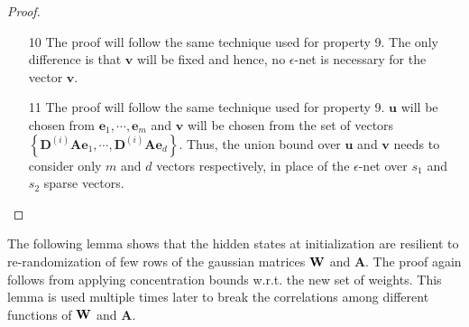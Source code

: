 \begin{proof}
\begin{enumerate}
		The proof follows from setting $t = \rho \sqrt{s_1}$ and taking an $\epsilon$-net bound over all $s_2$-sparse vectors $\mathbf{v}$ and $s_1$-sparse vectors $\mathbf{u}$, that amounts to an error probability at least $1-e^{\Omega(s_2 \log m)}e^{-\Omega(m/L^2)}- e^{\Omega(s_1 \log m)}e^{-\Omega(s_1 \rho^2)}$ , which simplifies to atleast $1-e^{-\Omega(\rho^2)}$, since $s_1, s_2 \le \frac{m}{\rho^3}$.
		\item[10] The proof will follow the same technique used for property 9. The only difference is that $\mathbf{v}$ will be fixed and hence, no $\epsilon$-net is necessary for the vector $\mathbf{v}$.
		\item[11] The proof will follow the same technique used for property 9. $\mathbf{u}$ will be chosen from $\mathbf{e}_1, \cdots, \mathbf{e}_m$ and $\mathbf{v}$ will be chosen from the set of vectors $\left\{ \mathbf{D}^{(i)} \mathbf{A}\mathbf{e}_1, \cdots, \mathbf{D}^{(i)} \mathbf{A}\mathbf{e}_d \right\}$. Thus, the union bound over $\mathbf{u}$ and $\mathbf{v}$ needs to consider only $m$ and $d$ vectors respectively, in place of the $\epsilon$-net over $s_1$ and $s_2$ sparse vectors.  
	\end{enumerate}
	
\end{proof}
The following lemma shows that the hidden states at initialization are resilient to re-randomization of few rows of the gaussian matrices $\mathbf{W}$ and $\mathbf{A}$. The proof again follows from applying concentration bounds w.r.t. the new set of weights. This lemma is used multiple times later to break the correlations among different functions of  $\mathbf{W}$ and $\mathbf{A}$.

